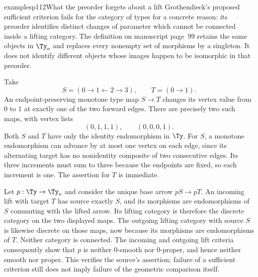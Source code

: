 \begin{dcomment}{examples}{p112}{What the preorder forgets about a lift}
Grothendieck's proposed sufficient criterion fails for the category of types for a concrete reason: its preorder identifies distinct changes of parameter which cannot be connected inside a lifting category. The definition on manuscript page~99 retains the same objects in $\Ty_o$ and replaces every nonempty set of morphisms by a singleton. It does not identify different objects whose images happen to be isomorphic in that preorder.

Take
\[
 S=(0\longrightarrow1\longleftarrow2\longrightarrow3),
 \qquad T=(0\longrightarrow1).
\]
An endpoint-preserving monotone type map $S\to T$ changes its vertex value from $0$ to $1$ at exactly one of the two forward edges. There are precisely two such maps, with vertex lists
\[
                    (0,1,1,1),\qquad(0,0,0,1).
\]
Both $S$ and $T$ have only the identity endomorphism in $\Ty$. For $S$, a monotone endomorphism can advance by at most one vertex on each edge, since its alternating target has no nonidentity composite of two consecutive edges. Its three increments must sum to three because the endpoints are fixed, so each increment is one. The assertion for $T$ is immediate.

Let $p:\Ty\to\Ty_o$ and consider the unique base arrow $pS\to pT$. An incoming lift with target $T$ has source exactly $S$, and its morphisms are endomorphisms of $S$ commuting with the lifted arrow. Its lifting category is therefore the discrete category on the two displayed maps. The outgoing lifting category with source $S$ is likewise discrete on those maps, now because its morphisms are endomorphisms of $T$. Neither category is connected. The incoming and outgoing lift criteria consequently show that $p$ is neither $0$-smooth nor $0$-proper, and hence neither smooth nor proper. This verifies the source's assertion; failure of a sufficient criterion still does not imply failure of the geometric comparison itself.
\end{dcomment}

